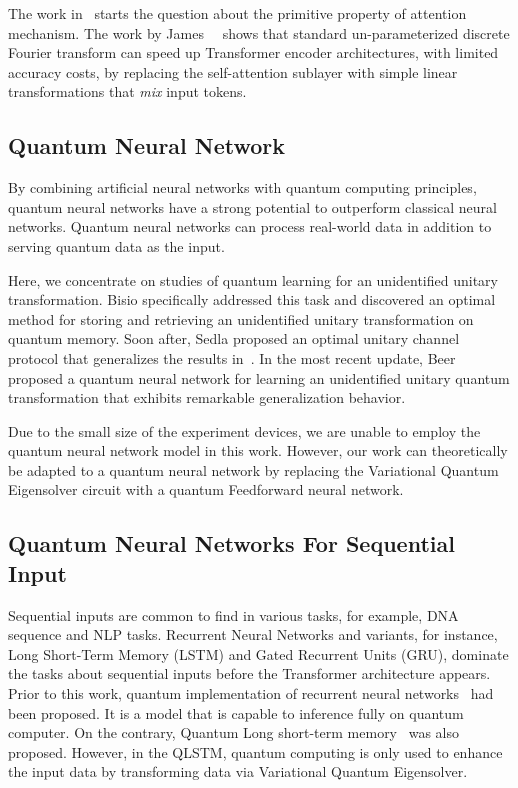 The work in~\cite{DBLP:journals/corr/abs-2105-02723} starts the question about the primitive property of attention mechanism. The work by James~\etal~\cite{DBLP:journals/corr/abs-2105-03824} shows that standard un-parameterized discrete Fourier transform can speed up Transformer encoder architectures, with limited accuracy costs, by replacing the self-attention sublayer with simple linear transformations that \emph{mix} input tokens.

\subsection{Quantum Neural Network}
By combining artificial neural networks with quantum computing principles, quantum neural networks have a strong potential to outperform classical neural networks. Quantum neural networks can process real-world data in addition to serving quantum data as the input.

Here, we concentrate on studies of quantum learning for an unidentified unitary transformation. Bisio \etal specifically addressed this task and discovered an optimal method for storing and retrieving an unidentified unitary transformation on quantum memory. Soon after, Sedla \etal proposed an optimal unitary channel protocol that generalizes the results in~\cite{}. In the most recent update, Beer \etal proposed a quantum neural network for learning an unidentified unitary quantum transformation that exhibits remarkable generalization behavior. 

Due to the small size of the experiment devices, we are unable to employ the quantum neural network model in this work. However, our work can theoretically be adapted to a quantum neural network by replacing the Variational Quantum Eigensolver circuit with a quantum Feedforward neural network. 

\subsection{Quantum Neural Networks For Sequential Input}

Sequential inputs are common to find in various tasks, for example, DNA sequence and NLP tasks. Recurrent Neural Networks and variants, for instance, Long Short-Term Memory (LSTM) and Gated Recurrent Units (GRU), dominate the tasks about sequential inputs before the Transformer architecture appears. Prior to this work, quantum implementation of recurrent neural networks~\cite{NEURIPS2020_0ec96be3} had been proposed. It is a model that is capable to inference fully on quantum computer. On the contrary, Quantum Long short-term memory~\cite{9747369} was also proposed. However, in the QLSTM, quantum computing is only used to enhance the input data by transforming data via Variational Quantum Eigensolver.

